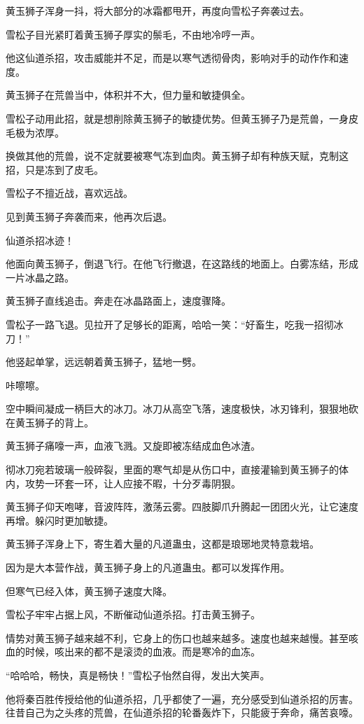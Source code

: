 \begin{this_body}
黄玉狮子浑身一抖，将大部分的冰霜都甩开，再度向雪松子奔袭过去。

雪松子目光紧盯着黄玉狮子厚实的鬃毛，不由地冷哼一声。

他这仙道杀招，攻击威能并不足，而是以寒气透彻骨肉，影响对手的动作作和速度。

黄玉狮子在荒兽当中，体积并不大，但力量和敏捷俱全。

雪松子动用此招，就是想削除黄玉狮子的敏捷优势。但黄玉狮子乃是荒兽，一身皮毛极为浓厚。

换做其他的荒兽，说不定就要被寒气冻到血肉。黄玉狮子却有种族天赋，克制这招，只是冻到了皮毛。

雪松子不擅近战，喜欢远战。

见到黄玉狮子奔袭而来，他再次后退。

仙道杀招冰迹！

他面向黄玉狮子，倒退飞行。在他飞行撤退，在这路线的地面上。白雾冻结，形成一片冰晶之路。

黄玉狮子直线追击。奔走在冰晶路面上，速度骤降。

雪松子一路飞退。见拉开了足够长的距离，哈哈一笑：“好畜生，吃我一招彻冰刀！”

他竖起单掌，远远朝着黄玉狮子，猛地一劈。

咔嚓嚓。

空中瞬间凝成一柄巨大的冰刀。冰刀从高空飞落，速度极快，冰刃锋利，狠狠地砍在黄玉狮子的背上。

黄玉狮子痛嚎一声，血液飞溅。又旋即被冻结成血色冰渣。

彻冰刀宛若玻璃一般碎裂，里面的寒气却是从伤口中，直接灌输到黄玉狮子的体内，攻势一环套一环，让人应接不暇，十分歹毒阴狠。

黄玉狮子仰天咆哮，音波阵阵，激荡云雾。四肢脚爪升腾起一团团火光，让它速度再增。躲闪时更加敏捷。

黄玉狮子浑身上下，寄生着大量的凡道蛊虫，这都是琅琊地灵特意栽培。

因为是大本营作战，黄玉狮子身上的凡道蛊虫。都可以发挥作用。

但寒气已经入体，黄玉狮子速度大降。

雪松子牢牢占据上风，不断催动仙道杀招。打击黄玉狮子。

情势对黄玉狮子越来越不利，它身上的伤口也越来越多。速度也越来越慢。甚至咳血的时候，咳出来的都不是滚烫的血液。而是寒冷的血冻。

“哈哈哈，畅快，真是畅快！”雪松子怡然自得，发出大笑声。

他将秦百胜传授给他的仙道杀招，几乎都使了一遍，充分感受到仙道杀招的厉害。往昔自己为之头疼的荒兽，在仙道杀招的轮番轰炸下，只能疲于奔命，痛苦哀嚎。


\end{this_body}

